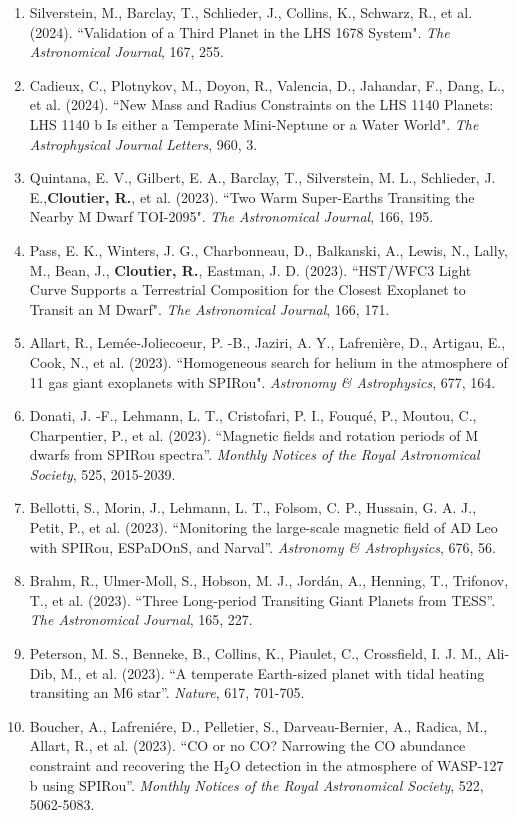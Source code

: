 \documentclass[12pt]{article}
\begin{document}
\begin{itemize}
\begin{enumerate}
\item Silverstein, M., Barclay, T., Schlieder, J., Collins, K., Schwarz, R., et al. (2024). ``Validation of a Third Planet in the LHS 1678 System". {\it The Astronomical Journal}, 167, 255.
\item Cadieux, C., Plotnykov, M., Doyon, R., Valencia, D., Jahandar, F., Dang, L., et al. (2024). ``New Mass and Radius Constraints on the LHS 1140 Planets: LHS 1140 b Is either a Temperate Mini-Neptune or a Water World". {\it The Astrophysical Journal Letters}, 960, 3.
\item Quintana, E. V., Gilbert, E. A., Barclay, T., Silverstein, M. L., Schlieder, J. E.,{\bf  Cloutier, R.}, et al. (2023). ``Two Warm Super-Earths Transiting the Nearby M Dwarf TOI-2095". {\it The Astronomical Journal}, 166, 195.
\item Pass, E. K., Winters, J. G., Charbonneau, D., Balkanski, A., Lewis, N., Lally, M., Bean, J., {\bf Cloutier, R.}, Eastman, J. D. (2023). ``HST/WFC3 Light Curve Supports a Terrestrial Composition for the Closest Exoplanet to Transit an M Dwarf". {\it The Astronomical Journal}, 166, 171.
\item Allart, R., Lemée-Joliecoeur, P. -B., Jaziri, A. Y., Lafrenière, D., Artigau, E., Cook, N., et al. (2023). ``Homogeneous search for helium in the atmosphere of 11 gas giant exoplanets with SPIRou". {\it Astronomy \& Astrophysics}, 677, 164.
\item Donati, J. -F., Lehmann, L. T., Cristofari, P. I., Fouqué, P., Moutou, C., Charpentier, P., et al. (2023). ``Magnetic fields and rotation periods of M dwarfs from SPIRou spectra''. {\it Monthly Notices of the Royal Astronomical Society}, 525, 2015-2039.
\item Bellotti, S., Morin, J., Lehmann, L. T., Folsom, C. P., Hussain, G. A. J., Petit, P., et al. (2023). ``Monitoring the large-scale magnetic field of AD Leo with SPIRou, ESPaDOnS, and Narval''. {\it Astronomy \& Astrophysics}, 676, 56.
\item Brahm, R., Ulmer-Moll, S., Hobson, M. J., Jordán, A., Henning, T., Trifonov, T., et al. (2023). ``Three Long-period Transiting Giant Planets from TESS''. {\it The Astronomical Journal}, 165, 227.
\item Peterson, M. S., Benneke, B., Collins, K., Piaulet, C., Crossfield, I. J. M., Ali-Dib, M., et al. (2023). ``A temperate Earth-sized planet with tidal heating transiting an M6 star''. {\it Nature}, 617, 701-705. 
\item Boucher, A., Lafreniére, D., Pelletier, S., Darveau-Bernier, A., Radica, M., Allart, R., et al. (2023). ``CO or no CO? Narrowing the CO abundance constraint and recovering the H$_2$O detection in the atmosphere of WASP-127 b using SPIRou''. {\it Monthly Notices of the Royal Astronomical Society}, 522, 5062-5083.

\end{enumerate}
\end{itemize}
\end{document}
